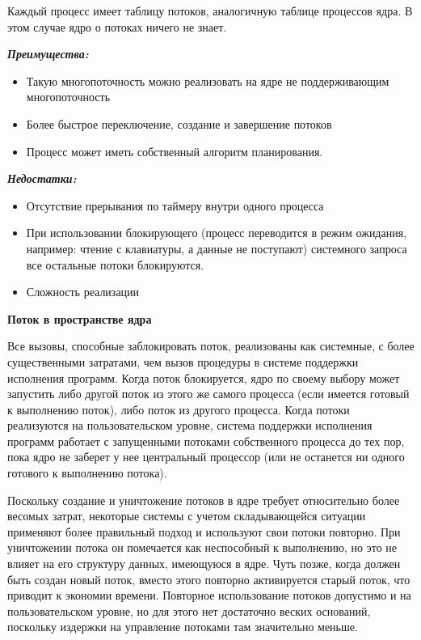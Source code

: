 Каждый процесс имеет таблицу потоков, аналогичную таблице процессов ядра. В этом случае ядро о потоках ничего не знает.

\textit{\textbf{Преимущества:}}

\begin{itemize}
   \item Такую многопоточность можно реализовать на ядре не поддерживающим многопоточность
   \item Более быстрое переключение, создание и завершение потоков
   \item Процесс может иметь собственный алгоритм планирования.
\end{itemize}

\textit{\textbf{Недостатки:}}
\begin{itemize}
   \item Отсутствие прерывания по таймеру внутри одного процесса
   \item При использовании блокирующего (процесс переводится в режим ожидания, например: чтение с клавиатуры, а данные не поступают) системного запроса все остальные потоки блокируются.
   \item Сложность реализации
\end{itemize}

\textbf{Поток в пространстве ядра}

Все вызовы, способные заблокировать поток, реализованы как системные, с более существенными затратами, чем вызов процедуры в системе поддержки исполнения программ. Когда поток блокируется, ядро по своему выбору может запустить либо другой поток из этого же самого процесса (если имеется готовый к выполнению поток), либо поток из другого процесса. Когда потоки реализуются на пользовательском уровне, система поддержки исполнения программ работает с запущенными потоками собственного процесса до тех пор, пока ядро не заберет у нее центральный процессор (или не останется ни одного готового к выполнению потока).

Поскольку создание и уничтожение потоков в ядре требует относительно более весомых затрат, некоторые системы с учетом складывающейся ситуации применяют более правильный подход и используют свои потоки повторно. При уничтожении потока он помечается как неспособный к выполнению, но это не влияет на его структуру данных, имеющуюся в ядре. Чуть позже, когда должен быть создан новый поток, вместо этого повторно активируется старый поток, что приводит к экономии времени. Повторное использование потоков допустимо и на пользовательском уровне, но для этого нет достаточно веских оснований, поскольку издержки на управление потоками там значительно меньше.

